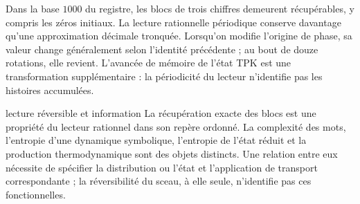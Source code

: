 Dans la base $1000$ du registre, les blocs de trois chiffres demeurent
récupérables, y compris les zéros initiaux. La lecture rationnelle
périodique conserve davantage qu'une approximation décimale tronquée.
Lorsqu'on modifie l'origine de phase, sa valeur change généralement selon
l'identité précédente ; au bout de douze rotations, elle revient.
L'avancée de mémoire de l'état TPK est une transformation supplémentaire :
la périodicité du lecteur n'identifie pas les histoires accumulées.

\begin{apunte}{lecture réversible et information}
La récupération exacte des blocs est une propriété du lecteur
rationnel dans son repère ordonné. La complexité des mots, l’entropie
d’une dynamique symbolique, l’entropie de l’état réduit et la
production thermodynamique sont des objets distincts. Une relation entre
eux nécessite de spécifier la distribution ou l’état et l’application de
transport correspondante ; la réversibilité du sceau, à elle seule,
n’identifie pas ces fonctionnelles.
\end{apunte}
